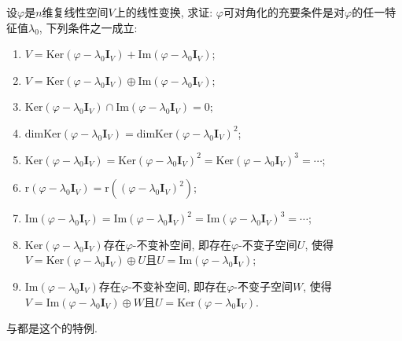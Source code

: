\documentclass[../../main.tex]{subfiles}%
\begin{document}
\begin{proposition}\label{proposition:可对角化的补充}
设\(\varphi\)是\(n\)维复线性空间\(V\)上的线性变换, 求证: \(\varphi\)可对角化的充要条件是对\(\varphi\)的任一特征值\(\lambda_{0}\), 下列条件之一成立:
\begin{enumerate}[(1)]
\item \(V = \mathrm{Ker}(\varphi-\lambda_{0}\boldsymbol{I}_{V})+\mathrm{Im}(\varphi-\lambda_{0}\boldsymbol{I}_{V})\);

\item \(V = \mathrm{Ker}(\varphi-\lambda_{0}\boldsymbol{I}_{V})\oplus\mathrm{Im}(\varphi-\lambda_{0}\boldsymbol{I}_{V})\);

\item \(\mathrm{Ker}(\varphi-\lambda_{0}\boldsymbol{I}_{V})\cap\mathrm{Im}(\varphi-\lambda_{0}\boldsymbol{I}_{V}) = 0\);

\item \(\mathrm{dim}\mathrm{Ker}(\varphi-\lambda_{0}\boldsymbol{I}_{V})=\mathrm{dim}\mathrm{Ker}(\varphi-\lambda_{0}\boldsymbol{I}_{V})^{2}\);

\item \(\mathrm{Ker}(\varphi-\lambda_{0}\boldsymbol{I}_{V})=\mathrm{Ker}(\varphi-\lambda_{0}\boldsymbol{I}_{V})^{2}=\mathrm{Ker}(\varphi-\lambda_{0}\boldsymbol{I}_{V})^{3}=\cdots\);

\item \(\mathrm{r}(\varphi-\lambda_{0}\boldsymbol{I}_{V})=\mathrm{r}((\varphi-\lambda_{0}\boldsymbol{I}_{V})^{2})\);

\item \(\mathrm{Im}(\varphi-\lambda_{0}\boldsymbol{I}_{V})=\mathrm{Im}(\varphi-\lambda_{0}\boldsymbol{I}_{V})^{2}=\mathrm{Im}(\varphi-\lambda_{0}\boldsymbol{I}_{V})^{3}=\cdots\);

\item \(\mathrm{Ker}(\varphi-\lambda_{0}\boldsymbol{I}_{V})\)存在\(\varphi\)-不变补空间, 即存在\(\varphi\)-不变子空间\(U\), 使得\(V = \mathrm{Ker}(\varphi-\lambda_{0}\boldsymbol{I}_{V})\oplus U\)且$U = \text{Im}(\varphi-\lambda_{0}\boldsymbol{I}_{V})$;

\item \(\mathrm{Im}(\varphi-\lambda_{0}\boldsymbol{I}_{V})\)存在\(\varphi\)-不变补空间, 即存在\(\varphi\)-不变子空间\(W\), 使得\(V = \mathrm{Im}(\varphi-\lambda_{0}\boldsymbol{I}_{V})\oplus W\)且$U = \text{Ker}(\varphi-\lambda_{0}\boldsymbol{I}_{V})$.
\end{enumerate}
\end{proposition}
\begin{remark}
与都是这个的特例.
\end{remark}
\end{document}
